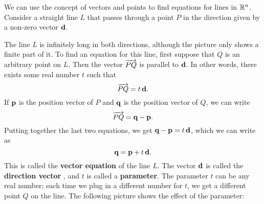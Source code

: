 We can use the concept of vectors and points to find equations for
lines in $\mathbb{R}^n$. Consider a straight line $L$ that passes through a
point $P$ in the direction given by a non-zero vector $\mbox{\bf d}$.
\begin{center}
\end{center}
The line $L$ is infinitely long in both directions, although the
picture only shows a finite part of it. To find an equation for this
line, first suppose that $Q$ is an arbitrary point on $L$. Then the
vector $\overrightarrow{PQ}$ is parallel to $\mbox{\bf d}$. In other words,
there exists some real number $t$ such that
\begin{equation*}
  \overrightarrow{PQ} = t\,\mbox{\bf d}.
\end{equation*}
If $\mbox{\bf p}$ is the position vector of $P$ and $\mbox{\bf q}$ is the
position vector of $Q$, we can write
\begin{equation*}
  \overrightarrow{PQ} = \mbox{\bf q}-\mbox{\bf p}.
\end{equation*}
Putting together the last two equations, we get $\mbox{\bf q}-\mbox{\bf p} =
t\,\mbox{\bf d}$, which we can write as
\begin{equation*}
  \mbox{\bf q} = \mbox{\bf p} + t\,\mbox{\bf d}.
\end{equation*}
This is called the \textbf{vector equation}%
 of the
line $L$. The vector $\mbox{\bf d}$ is called the \textbf{direction
  vector}%
, and $t$ is
called a \textbf{parameter}. The parameter $t$ can be
any real number; each time we plug in a different number for $t$, we
get a different point $Q$ on the line. The following picture shows the
effect of the parameter:
